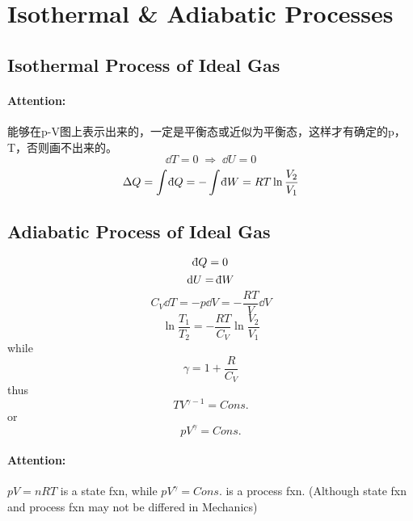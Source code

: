 \documentclass[UTF8]{ctexart} %
\DeclareMathOperator{\dra}{\Rightarrow}
\newcommand{\dbar}{{\mathchar'26\mkern-11mu\mathrm{d}}}
\numberwithin{equation}{subsection}
\begin{document}
\section{Isothermal \& Adiabatic Processes}
\subsection{}
\subsection{Isothermal Process of Ideal Gas}
\paragraph{Attention:}
能够在p-V图上表示出来的，一定是平衡态或近似为平衡态，这样才有确定的p，T，否则画不出来的。\\
\begin{equation}\label{key}
\dd T = 0\;\dra\; \dd U = 0
\end{equation}
\begin{equation}\label{key}
\Delta Q = \int\dbar Q = -\int\dbar W = RT\ln\dfrac{V_2}{V_1}
\end{equation}

\subsection{Adiabatic Process of Ideal Gas}
\begin{equation}\label{key}
\dbar Q = 0
\end{equation}
\begin{equation}\label{key}
\dd U = \dbar W
\end{equation}
\begin{equation}\label{key}
C_V\dd T = -p\dd V = -\dfrac{RT}{V}\dd V
\end{equation}
\begin{equation}\label{key}
\ln\dfrac{T_1}{T_2} = -\dfrac{RT}{C_V}\ln\dfrac{V_2}{V_1}
\end{equation}
while
\begin{equation}\label{key}
\gamma = 1 + \dfrac{R}{C_V}
\end{equation}
thus
\begin{equation}\label{key}
TV^{\gamma-1} = Cons.
\end{equation}
or
\begin{equation}\label{key}
pV^\gamma = Cons.
\end{equation}
\paragraph{Attention:}
$pV = nRT$ is a state fxn, while $pV^\gamma = Cons.$ is a process fxn. (Although state fxn and process fxn may not be differed in Mechanics)
\end{document}
